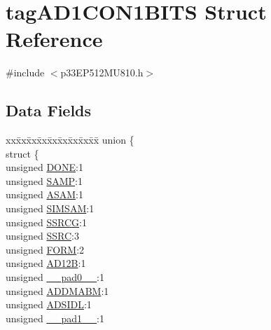 \hypertarget{structtag_a_d1_c_o_n1_b_i_t_s}{}\section{tag\+A\+D1\+C\+O\+N1\+B\+I\+TS Struct Reference}
\label{structtag_a_d1_c_o_n1_b_i_t_s}


{\ttfamily \#include $<$p33\+E\+P512\+M\+U810.\+h$>$}

\subsection*{Data Fields}
\begin{DoxyCompactItemize}
\item 
\begin{tabbing}
xx\=xx\=xx\=xx\=xx\=xx\=xx\=xx\=xx\=\kill
union \{\\
\>struct \{\\
\>\>unsigned \hyperlink{structtag_a_d1_c_o_n1_b_i_t_s_a15532dd1cb7c63353dbcb36d3962baf1}{DONE}:1\\
\>\>unsigned \hyperlink{structtag_a_d1_c_o_n1_b_i_t_s_a2c46df2a264a12a002c863d23b94fc5b}{SAMP}:1\\
\>\>unsigned \hyperlink{structtag_a_d1_c_o_n1_b_i_t_s_a913e6cc3f1d245b0476d7c561769366d}{ASAM}:1\\
\>\>unsigned \hyperlink{structtag_a_d1_c_o_n1_b_i_t_s_aec58b2ae10279e5d3cc9eef4fbe7aeba}{SIMSAM}:1\\
\>\>unsigned \hyperlink{structtag_a_d1_c_o_n1_b_i_t_s_a70991a103c529d7b9b7fde74950ee286}{SSRCG}:1\\
\>\>unsigned \hyperlink{structtag_a_d1_c_o_n1_b_i_t_s_a9810ed3c5c2ba3614bb8e9bbd603a907}{SSRC}:3\\
\>\>unsigned \hyperlink{structtag_a_d1_c_o_n1_b_i_t_s_afbdaf5e6343bd8c6dd528acc7c621f0d}{FORM}:2\\
\>\>unsigned \hyperlink{structtag_a_d1_c_o_n1_b_i_t_s_a6046e302413fe47e452f17a6d0c581ae}{AD12B}:1\\
\>\>unsigned \hyperlink{structtag_a_d1_c_o_n1_b_i_t_s_adf71f3d8410c1f1dbbc96680a92c49af}{\_\_pad0\_\_}:1\\
\>\>unsigned \hyperlink{structtag_a_d1_c_o_n1_b_i_t_s_ae338b78f9690cf9d9987d26d98699dee}{ADDMABM}:1\\
\>\>unsigned \hyperlink{structtag_a_d1_c_o_n1_b_i_t_s_a59f01714def50ae128668a90c0d2d2bc}{ADSIDL}:1\\
\>\>unsigned \hyperlink{structtag_a_d1_c_o_n1_b_i_t_s_acaf2d0924a107ec6e8d2e31febaf66f9}{\_\_pad1\_\_}:1\\

\end{tabbing}
\end{DoxyCompactItemize}
